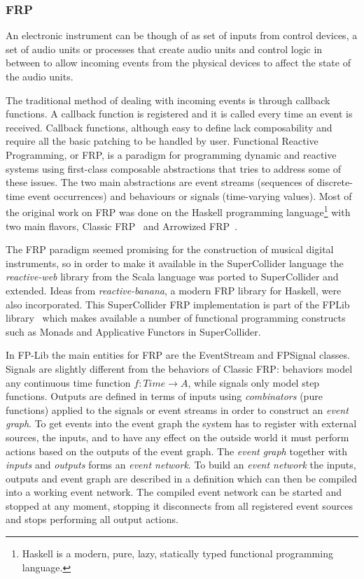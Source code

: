 \documentclass{article}
\begin{document}
\subsubsection{FRP}

An electronic instrument can be though of as set of inputs from control devices, a set of audio units or processes that create audio units and control logic in between to allow incoming events from the physical devices to affect the state of the audio units. 

The traditional method of dealing with incoming events is through callback functions. A callback function is registered and it is called every time an event is received. Callback functions, although easy to define lack composability and require all the basic patching to be handled by user. Functional Reactive Programming, or FRP, is a paradigm for programming dynamic and reactive systems using first-class composable abstractions that tries to address some of these issues. The two main abstractions are event streams (sequences of discrete-time event occurrences) and behaviours or signals (time-varying values). Most of the original work on FRP was done on the Haskell programming language\footnote{Haskell is a modern, pure, lazy, statically typed functional programming language.} with two main flavors, Classic FRP~\cite{elliott1997-fun,elliott2009-pus} and Arrowized FRP~\cite{hudak2003-arr,courtney2003yampa}.

The FRP paradigm seemed promising for the construction of musical digital instruments, so in order to make it available in the SuperCollider language the \emph{reactive-web} library from the Scala language was ported to SuperCollider and extended. Ideas from \emph{reactive-banana}, a modern FRP library for Haskell, were also incorporated. This SuperCollider FRP implementation is part of the FPLib library~\cite{-fpl} which makes available a number of functional programming constructs such as Monads and Applicative Functors in SuperCollider.
 
In FP-Lib the main entities for FRP are the EventStream and FPSignal classes. Signals are slightly different from the behaviors of Classic FRP: behaviors model any continuous time function $f:Time\rightarrow A$, while signals only model step functions.  Outputs are defined in terms of inputs using \emph{combinators} (pure functions) applied to the signals or event streams in order to construct an \emph{event graph}. To get events into the event graph the system has to register with external sources, the inputs, and to have any effect on the outside world it must perform actions based on the outputs of the event graph. The \emph{event graph} together with \emph{inputs} and \emph{outputs} forms an \emph{event network}. To build an \emph{event network} the inputs, outputs and event graph are described in a definition which can then be compiled into a working event network. The compiled event network can be started and stopped at any moment, stopping it disconnects from all registered event sources and stops performing all output actions.
\end{document}
